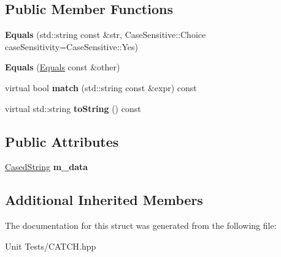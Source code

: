 \subsection*{Public Member Functions}
\begin{DoxyCompactItemize}
\item 
{\bfseries Equals} (std\+::string const \&str, Case\+Sensitive\+::\+Choice case\+Sensitivity=Case\+Sensitive\+::\+Yes)\hypertarget{structCatch_1_1Matchers_1_1Impl_1_1StdString_1_1Equals_a5921d5ed75320fb64a678e3f1292a464}{}\label{structCatch_1_1Matchers_1_1Impl_1_1StdString_1_1Equals_a5921d5ed75320fb64a678e3f1292a464}

\item 
{\bfseries Equals} (\hyperlink{structCatch_1_1Matchers_1_1Impl_1_1StdString_1_1Equals}{Equals} const \&other)\hypertarget{structCatch_1_1Matchers_1_1Impl_1_1StdString_1_1Equals_acaa97de06aedf363ae803d65a975f5e4}{}\label{structCatch_1_1Matchers_1_1Impl_1_1StdString_1_1Equals_acaa97de06aedf363ae803d65a975f5e4}

\item 
virtual bool {\bfseries match} (std\+::string const \&expr) const \hypertarget{structCatch_1_1Matchers_1_1Impl_1_1StdString_1_1Equals_a00c8259a76c24da669e116662ededc70}{}\label{structCatch_1_1Matchers_1_1Impl_1_1StdString_1_1Equals_a00c8259a76c24da669e116662ededc70}

\item 
virtual std\+::string {\bfseries to\+String} () const \hypertarget{structCatch_1_1Matchers_1_1Impl_1_1StdString_1_1Equals_a7a09449ff2f858981caf3b1f6c36d270}{}\label{structCatch_1_1Matchers_1_1Impl_1_1StdString_1_1Equals_a7a09449ff2f858981caf3b1f6c36d270}

\end{DoxyCompactItemize}
\subsection*{Public Attributes}
\begin{DoxyCompactItemize}
\item 
\hyperlink{structCatch_1_1Matchers_1_1Impl_1_1StdString_1_1CasedString}{Cased\+String} {\bfseries m\+\_\+data}\hypertarget{structCatch_1_1Matchers_1_1Impl_1_1StdString_1_1Equals_ae09964b7ba291ce574b514a2ee3eddb0}{}\label{structCatch_1_1Matchers_1_1Impl_1_1StdString_1_1Equals_ae09964b7ba291ce574b514a2ee3eddb0}

\end{DoxyCompactItemize}
\subsection*{Additional Inherited Members}


The documentation for this struct was generated from the following file\+:\begin{DoxyCompactItemize}
\item 
Unit Tests/C\+A\+T\+C\+H.\+hpp\end{DoxyCompactItemize}
